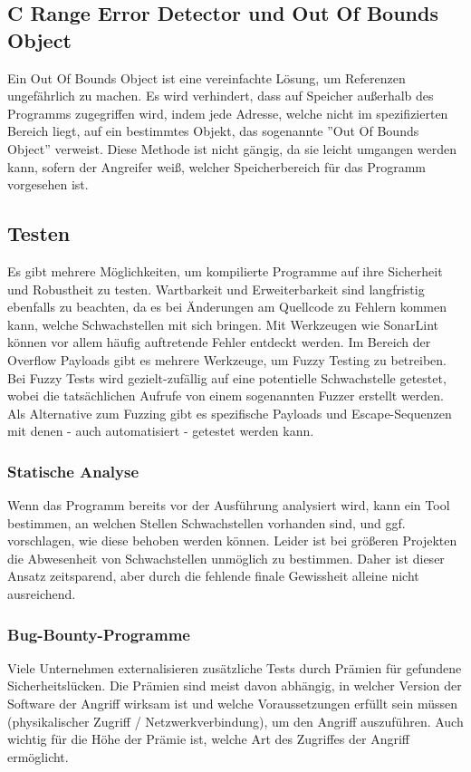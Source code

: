 \subsection{C Range Error Detector und Out Of Bounds Object}
Ein Out Of Bounds Object ist eine vereinfachte Lösung, um Referenzen ungefährlich zu machen.
Es wird verhindert, dass auf Speicher außerhalb des Programms zugegriffen wird, indem jede
Adresse, welche nicht im spezifizierten Bereich liegt, auf ein bestimmtes Objekt, das sogenannte
''Out Of Bounds Object'' verweist. Diese Methode ist nicht gängig, da sie leicht
umgangen werden kann, sofern der Angreifer weiß, welcher Speicherbereich für das Programm
vorgesehen ist.



\subsection{Testen}
Es gibt mehrere Möglichkeiten, um kompilierte Programme auf ihre Sicherheit
und Robustheit zu testen. Wartbarkeit und Erweiterbarkeit
sind langfristig ebenfalls zu beachten, da es bei Änderungen am Quellcode
zu Fehlern kommen kann, welche Schwachstellen mit sich bringen.
Mit Werkzeugen wie SonarLint können vor allem häufig auftretende Fehler entdeckt
werden.
Im Bereich der Overflow Payloads gibt es mehrere Werkzeuge, um Fuzzy Testing
zu betreiben. Bei Fuzzy Tests wird gezielt-zufällig auf eine
potentielle Schwachstelle getestet, wobei die tatsächlichen Aufrufe
von einem sogenannten Fuzzer erstellt werden.
Als Alternative zum Fuzzing gibt es spezifische Payloads und
Escape-Sequenzen mit denen - auch automatisiert - getestet werden kann.

\subsubsection{Statische Analyse}
Wenn das Programm bereits vor der Ausführung analysiert wird, kann ein
Tool bestimmen, an welchen Stellen Schwachstellen vorhanden sind, und
ggf. vorschlagen, wie diese behoben werden können. Leider ist bei größeren
Projekten die Abwesenheit von Schwachstellen unmöglich zu bestimmen. 
Daher ist dieser Ansatz zeitsparend, aber durch die fehlende finale Gewissheit alleine nicht ausreichend.


\subsubsection{Bug-Bounty-Programme} \label{sec:bounties}
Viele Unternehmen externalisieren zusätzliche Tests durch Prämien für gefundene Sicherheitslücken.
Die Prämien sind meist davon abhängig, in welcher Version der Software der Angriff 
wirksam ist und welche Voraussetzungen erfüllt sein müssen (physikalischer Zugriff / Netzwerkverbindung),
um den Angriff auszuführen. Auch wichtig für die Höhe der Prämie ist, welche Art des Zugriffes
der Angriff ermöglicht.

